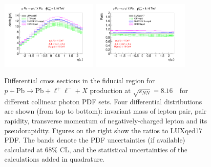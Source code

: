 \begin{figure}[]
\includegraphics[width=0.43\textwidth]{figures/etal_inc_cut.pdf}
\includegraphics[width=0.43\textwidth]{figures/Ratioetal_inc_cut.pdf}
\caption{Differential cross sections in the fiducial region for $p+\textrm{Pb}\rightarrow \textrm{Pb} + \ell^+\ell^- + X$ production at $\sqrt{s_{N N}} = 8.16$~\TeV\ for different collinear photon PDF sets.
Four differential distributions are shown (from top to bottom): invariant mass of lepton pair, pair rapidity, transverse momentum of negatively-charged lepton and its pseudorapidity. Figures on the right show the ratios to LUXqed17 PDF. The bands denote the PDF uncertainties (if available) calculated at 68\% CL, and the statistical uncertainties of the calculations added in quadrature.}
\label{fig:inc_cut}
\end{figure}

